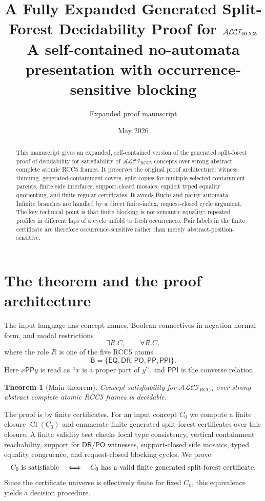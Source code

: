 \documentclass[11pt]{article}
\title{A Fully Expanded Generated Split-Forest Decidability Proof for $\Logic$\\
       \large A self-contained no-automata presentation with occurrence-sensitive blocking}
\author{Expanded proof manuscript}
\date{May 2026}
\newtheorem{theorem}{Theorem}[section]
\newcommand{\Logic}{\mathcal{ALCI}_{\mathrm{RCC5}}}
\newcommand{\Base}{\mathsf B}
\newcommand{\EQ}{\mathsf{EQ}}
\newcommand{\DR}{\mathsf{DR}}
\newcommand{\PO}{\mathsf{PO}}
\newcommand{\PP}{\mathsf{PP}}
\newcommand{\PPI}{\mathsf{PPI}}
\newcommand{\Cl}{\operatorname{Cl}}
\begin{document}
\maketitle

\begin{abstract}
This manuscript gives an expanded, self-contained version of the generated split-forest proof of decidability for satisfiability of $\Logic$ concepts over strong abstract complete atomic RCC5 frames.  It preserves the original proof architecture: witness thinning, generated containment covers, split copies for multiple selected containment parents, finite side interfaces, support-closed mosaics, explicit typed equality quotienting, and finite regular certificates.  It avoids Buchi and parity automata.  Infinite branches are handled by a direct finite-index, request-closed cycle argument.  The key technical point is that finite blocking is not semantic equality: repeated profiles in different laps of a cycle unfold to fresh occurrences.  Pair labels in the finite certificate are therefore occurrence-sensitive rather than merely abstract-position-sensitive.
\end{abstract}

\tableofcontents

\section{The theorem and the proof architecture}

The input language has concept names, Boolean connectives in negation normal form, and modal restrictions
\[
   \exists R.C,\qquad \forall R.C,
\]
where the role $R$ is one of the five RCC5 atoms
\[
   \Base=\{\EQ,\DR,\PO,\PP,\PPI\}.
\]
Here $x\PP y$ is read as ``$x$ is a proper part of $y$'', and $\PPI$ is the converse relation.

\begin{theorem}[Main theorem]\label{thm:main}
Concept satisfiability for $\Logic$ over strong abstract complete atomic RCC5 frames is decidable.
\end{theorem}

The proof is by finite certificates.  For an input concept $C_0$ we compute a finite closure $\Cl(C_0)$ and enumerate finite generated split-forest certificates over this closure.  A finite validity test checks local type consistency, vertical containment reachability, support for $\DR/\PO$ witnesses, support-closed side mosaics, typed equality congruence, and request-closed blocking cycles.  We prove
\[
 C_0\hbox{ is satisfiable}
 \quad\Longleftrightarrow\quad
 C_0\hbox{ has a valid finite generated split-forest certificate.}
\]
Since the certificate universe is effectively finite for fixed $C_0$, this equivalence yields a decision procedure.
\end{document}
